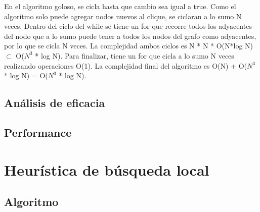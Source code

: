 \documentclass[a4paper, 10pt, twoside]{article}
\begin{document}
En el algoritmo goloso, se cicla hasta que cambio sea igual a true. Como el algoritmo solo puede agregar nodos nuevos al clique, se ciclaran a lo sumo N veces.
Dentro del ciclo del while se tiene un for que recorre todos los adyacentes del nodo que a lo sumo puede tener a todos los nodos del grafo como adyacentes, por lo que se cicla N veces.
La complejidad ambos ciclos es N * N * O(N*log N) $\subset$ O($N^3$ * log N).
Para finalizar, tiene un for que cicla a lo sumo N veces realizando operaciones O(1).
La complejidad final del algoritmo es O(N) + O($N^3$ * log N) = O($N^3$ * log N).

\subsection{Análisis de eficacia}

\subsection{Performance}


\newpage

\section{Heurística de búsqueda local}
\subsection{Algoritmo}
\end{document}
